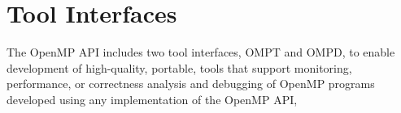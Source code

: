 %
%
%
%
%
%
%
%
%
%
%
%
%

\section{Tool Interfaces}
\label{subsec:Tool Support}

The OpenMP API includes two tool interfaces, OMPT and OMPD,
to enable development of high-quality, portable, tools that support
monitoring, performance, or correctness analysis and debugging of OpenMP programs
developed using any implementation of the OpenMP API,


